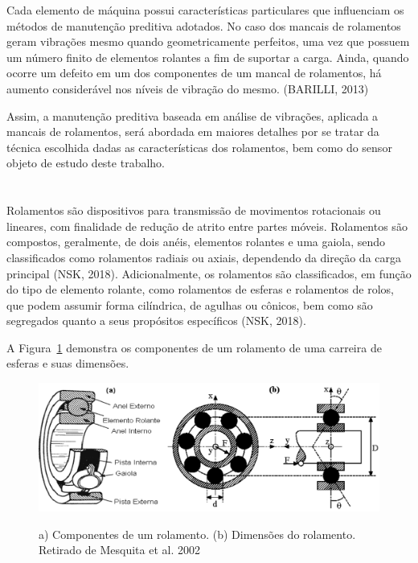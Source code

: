 \documentclass[
	12pt,				
	oneside,			
	a4paper,			
	english,			
	brazil,			
	]{abntex2ppgsi}
\begin{document}
Cada elemento de máquina possui características particulares que influenciam os métodos de manutenção preditiva adotados. No caso dos mancais de rolamentos geram vibrações mesmo quando geometricamente perfeitos, uma vez que possuem um número finito de elementos rolantes a fim de suportar a carga. Ainda, quando ocorre um defeito em um dos componentes de um mancal de rolamentos, há aumento considerável nos níveis de vibração do mesmo. (BARILLI, 2013)

Assim, a manutenção preditiva baseada em análise de vibrações, aplicada a mancais de rolamentos, será abordada em maiores detalhes por se tratar da técnica escolhida dadas as características dos rolamentos, bem como do sensor objeto de estudo deste trabalho.



\newpage
\section{}
Rolamentos são dispositivos para transmissão de movimentos rotacionais ou lineares, com finalidade de redução de atrito entre partes móveis. Rolamentos são compostos, geralmente, de dois anéis, elementos rolantes e uma gaiola, sendo classificados como rolamentos radiais ou axiais, dependendo da direção da carga principal (NSK, 2018). Adicionalmente, os rolamentos são classificados, em função do tipo de elemento rolante, como rolamentos de esferas e rolamentos de rolos, que podem assumir forma cilíndrica, de agulhas ou cônicos, bem como são segregados quanto a seus propósitos específicos (NSK, 2018).

A Figura~\ref{ComponentesRolamentos} demonstra os componentes de um rolamento de uma carreira de esferas e suas dimensões. 

\begin{figure}[!htb]
\centering
\caption{a) Componentes de um rolamento. (b) Dimensões do rolamento. Retirado de Mesquita et al. 2002}
\includegraphics[width=\textwidth,height=\textheight,keepaspectratio]{Figura1}
\label{ComponentesRolamentos}
\end{figure}
\end{document}
